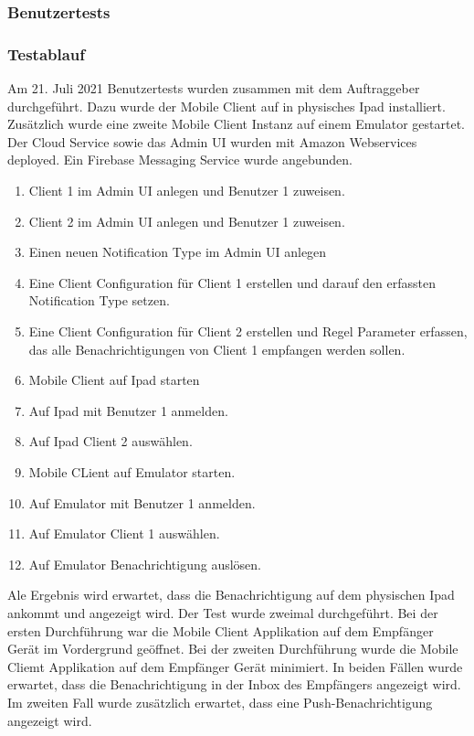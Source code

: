 \subsubsection*{Benutzertests}

\subsubsection*{Testablauf}

Am 21. Juli 2021 Benutzertests wurden zusammen mit dem Auftraggeber durchgeführt.
Dazu wurde der Mobile Client auf in physisches Ipad installiert.
Zusätzlich wurde eine zweite Mobile Client Instanz auf einem Emulator gestartet.
Der Cloud Service sowie das Admin UI wurden mit Amazon Webservices deployed.
Ein Firebase Messaging Service wurde angebunden.

\begin{enumerate}
    \item Client 1 im Admin UI anlegen und Benutzer 1 zuweisen.
    \item Client 2 im Admin UI anlegen und Benutzer 1 zuweisen.
    \item Einen neuen Notification Type im Admin UI anlegen
    \item Eine Client Configuration für Client 1 erstellen und darauf den erfassten Notification Type setzen.
    \item Eine Client Configuration für Client 2 erstellen und Regel Parameter erfassen, das alle Benachrichtigungen von Client 1 empfangen werden sollen.
    \item Mobile Client auf Ipad starten
    \item Auf Ipad mit Benutzer 1 anmelden.
    \item Auf Ipad Client 2 auswählen.
    \item Mobile CLient auf Emulator starten.
    \item Auf Emulator mit Benutzer 1 anmelden.
    \item Auf Emulator Client 1 auswählen.
    \item Auf Emulator Benachrichtigung auslösen.
\end{enumerate}

Ale Ergebnis wird erwartet, dass die Benachrichtigung auf dem physischen Ipad ankommt und angezeigt wird.
Der Test wurde zweimal durchgeführt.
Bei der ersten Durchführung war die Mobile Client Applikation auf dem Empfänger Gerät im Vordergrund geöffnet.
Bei der zweiten Durchführung wurde die Mobile Cliemt Applikation auf dem Empfänger Gerät minimiert.
In beiden Fällen wurde erwartet, dass die Benachrichtigung in der Inbox des Empfängers angezeigt wird.
Im zweiten Fall wurde zusätzlich erwartet, dass eine Push-Benachrichtigung angezeigt wird.

